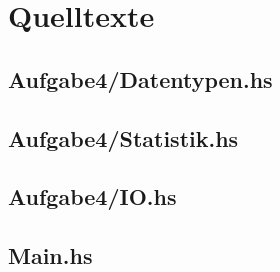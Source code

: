 \documentclass{scrreprt}
\begin{document}
\chapter{Quelltexte}

\section{Aufgabe4/Datentypen.hs}


\section{Aufgabe4/Statistik.hs}


\section{Aufgabe4/IO.hs}


\section{Main.hs}

\end{document}
